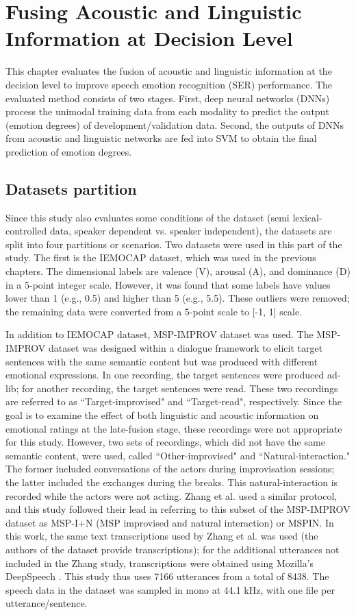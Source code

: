 \chapter{Fusing Acoustic and Linguistic Information at Decision Level}

This chapter evaluates the fusion of acoustic and linguistic information at the
decision level to improve speech emotion recognition (SER) performance. The
evaluated method consists of two stages. First, deep neural networks (DNNs)
process the unimodal training data from each modality to predict the output
(emotion degrees) of development/validation data. Second, the outputs of DNNs
from acoustic and linguistic networks are fed into SVM to obtain the final
prediction of emotion degrees. 

\section{Datasets partition}
Since this study also evaluates some conditions of the dataset (semi
lexical-controlled data, speaker dependent vs. speaker independent), the
datasets are split into four partitions or scenarios.  Two datasets were
used in this part of the study. The first is the IEMOCAP dataset, which was
used in the previous chapters. The dimensional labels are valence (V), arousal
(A), and dominance (D) in a 5-point integer scale.  However, it was found that
some labels have values lower than 1 (e.g., 0.5) and higher than 5 (e.g., 5.5).
These outliers were removed; the remaining data were converted from a
5-point scale to [-1, 1] scale.

In addition to IEMOCAP dataset, MSP-IMPROV dataset \cite{busso2016msp} was
used.  The MSP-IMPROV dataset was designed within a dialogue framework to
elicit target sentences with the same semantic content but was produced with
different emotional expressions. In one recording, the target sentences were
produced ad-lib; for another recording, the target sentences were read.  These
two recordings are referred to as ``Target-improvised" and ``Target-read",
respectively. Since the goal is to examine the effect of both linguistic and
acoustic information on emotional ratings at the late-fusion stage, these
recordings were not appropriate for this study. However, two sets of
recordings, which did not have the same semantic content, were used, called
``Other-improvised" and ``Natural-interaction." The former included
conversations of the actors during improvisation sessions; the latter included
the exchanges during the breaks. This natural-interaction is recorded while the
actors were not acting. Zhang et al. \cite{ Zhang2019} used a similar protocol,
and this study followed their lead in referring to this subset of the
MSP-IMPROV dataset as MSP-I+N (MSP improvised and natural interaction) or
MSPIN. In this work, the same text transcriptions used by Zhang et al. was used
(the authors of the dataset provide transcriptions); for the additional
utterances not included in the Zhang study, transcriptions were obtained using
Mozilla's DeepSpeech \cite{DeepSpeech2019}.  This study thus uses 7166
utterances from a total of 8438. The speech data in the dataset was sampled in
mono at 44.1 kHz, with one file per utterance/sentence.

